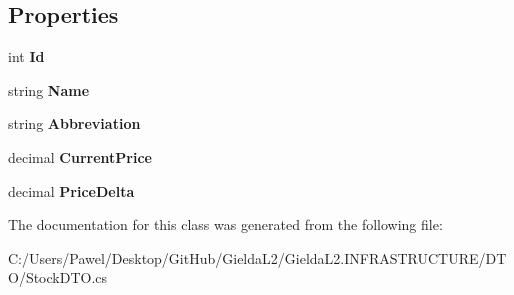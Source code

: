 \subsection*{Properties}
\begin{DoxyCompactItemize}
\item 
\mbox{\label{class_gielda_l2_1_1_i_n_f_r_a_s_t_r_u_c_t_u_r_e_1_1_d_t_o_1_1_stock_d_t_o_a44213b9345ffafd70609a83ab4df13bd}} 
int {\bfseries Id}
\item 
\mbox{\label{class_gielda_l2_1_1_i_n_f_r_a_s_t_r_u_c_t_u_r_e_1_1_d_t_o_1_1_stock_d_t_o_af5292ecb4fe53d387e9e447e4263da01}} 
string {\bfseries Name}
\item 
\mbox{\label{class_gielda_l2_1_1_i_n_f_r_a_s_t_r_u_c_t_u_r_e_1_1_d_t_o_1_1_stock_d_t_o_a89d841e9b54f6cbb052391b87775b504}} 
string {\bfseries Abbreviation}
\item 
\mbox{\label{class_gielda_l2_1_1_i_n_f_r_a_s_t_r_u_c_t_u_r_e_1_1_d_t_o_1_1_stock_d_t_o_aee5c4531346f71eecf6583fa507c6528}} 
decimal {\bfseries Current\+Price}
\item 
\mbox{\label{class_gielda_l2_1_1_i_n_f_r_a_s_t_r_u_c_t_u_r_e_1_1_d_t_o_1_1_stock_d_t_o_abd53d754620bf6ca17528c7b688e76f8}} 
decimal {\bfseries Price\+Delta}
\end{DoxyCompactItemize}


The documentation for this class was generated from the following file\+:\begin{DoxyCompactItemize}
\item 
C\+:/\+Users/\+Pawel/\+Desktop/\+Git\+Hub/\+Gielda\+L2/\+Gielda\+L2.\+I\+N\+F\+R\+A\+S\+T\+R\+U\+C\+T\+U\+R\+E/\+D\+T\+O/Stock\+D\+T\+O.\+cs\end{DoxyCompactItemize}
